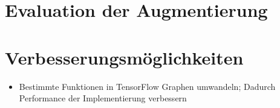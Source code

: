 \section{Evaluation der Augmentierung}

\section{Verbesserungsmöglichkeiten}
\begin{itemize}
   \item Bestimmte Funktionen in TensorFlow Graphen umwandeln; Dadurch Performance der Implementierung verbessern
\end{itemize}